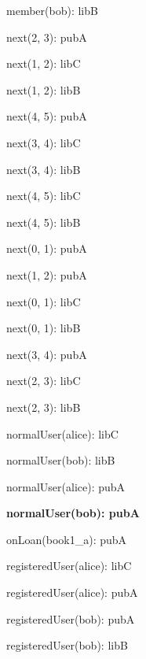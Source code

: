 \documentclass{article}
\newenvironment{states}
        {\begin{minipage}{\tableWidth}\raggedright\begin{description}[align=left,leftmargin=1em,noitemsep,labelsep=\parindent]}
        {\end{description}\end{minipage}}
\begin{document}
{\begin{states}
\item{{member(\allowbreak{}bob): libB}}
\item{{next(\allowbreak{}2, 3): pubA}}
\item{{next(\allowbreak{}1, 2): libC}}
\item{{next(\allowbreak{}1, 2): libB}}
\item{{next(\allowbreak{}4, 5): pubA}}
\item{{next(\allowbreak{}3, 4): libC}}
\item{{next(\allowbreak{}3, 4): libB}}
\item{{next(\allowbreak{}4, 5): libC}}
\item{{next(\allowbreak{}4, 5): libB}}
\item{{next(\allowbreak{}0, 1): pubA}}
\item{{next(\allowbreak{}1, 2): pubA}}
\item{{next(\allowbreak{}0, 1): libC}}
\item{{next(\allowbreak{}0, 1): libB}}
\item{{next(\allowbreak{}3, 4): pubA}}
\item{{next(\allowbreak{}2, 3): libC}}
\item{{next(\allowbreak{}2, 3): libB}}
\item{{normalUser(\allowbreak{}alice): libC}}
\item{{normalUser(\allowbreak{}bob): libB}}
\item{{normalUser(\allowbreak{}alice): pubA}}
\item\textbf{{normalUser(\allowbreak{}bob): pubA}}
\item{{onLoan(\allowbreak{}book1\_a): pubA}}
\item{{registeredUser(\allowbreak{}alice): libC}}
\item{{registeredUser(\allowbreak{}alice): pubA}}
\item{{registeredUser(\allowbreak{}bob): pubA}}
\item{{registeredUser(\allowbreak{}bob): libB}}
\end{states}}
\end{document}
